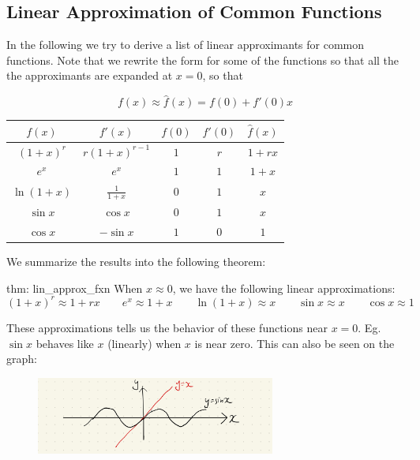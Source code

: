 \subsection{Linear Approximation of Common Functions}
In the following we try to derive a list of linear approximants for common functions.  Note that we rewrite the form for some of the functions so that all the the approximants are expanded at $x=0$, so that

\[f(x) \approx \hat{f}(x) = f(0)+f'(0)x\]
\begin{table}[ht]
    \centering
    \begin{tabular}{ccccc}
        $f(x)$ & $f'(x)$ & $f(0)$ & $f'(0)$ & $\hat{f}(x)$\\
        \hline
        $(1+x)^r$ & $r(1+x)^{r-1}$ & $1$ & $r$ & $1+rx$ \\
        $e^x$ & $e^x$ & $1$ & $1$ & $1+x$ \\
        $\ln(1+x)$ & $\frac{1}{1+x}$ & $0$ & $1$ & $x$ \\
        $\sin x$ & $\cos x$ & $0$ & $1$ & $x$ \\
        $\cos x$ & $-\sin x$ & $1$ & $0$ & $1$
    \end{tabular}
    \label{tab: lin_approx_deriv}
\end{table}

We summarize the results into the following theorem:

\pagebreak

\begin{theo}{thm: lin_approx_fxn}
    When $x \approx 0$, we have the following linear approximations:
    \[(1+x)^r \approx 1+rx \qquad e^x \approx 1+x \qquad \ln(1+x) \approx x \qquad \sin x \approx x \qquad \cos x \approx 1 \]
\end{theo}

\begin{remark}
    These approximations tells us the behavior of these functions near $x=0$. Eg. $\sin x$ behaves like $x$ (linearly) when $x$ is near zero.  This can also be seen on the graph:
\end{remark}

\begin{figure}[ht]
    \centering
    \includegraphics[width = 0.7\textwidth]{figures/chap 05/lin_approx_sin.png}
    \label{fig: lin_approx_sin}
\end{figure}

